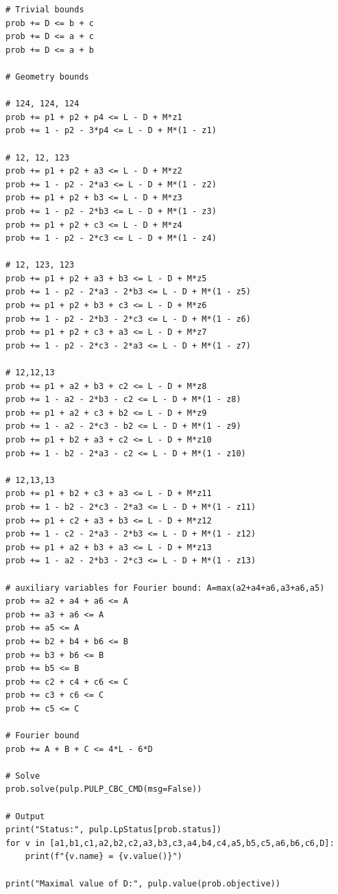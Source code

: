 \documentclass[a4paper,11pt,twoside,reqno]{amsart}
\theoremstyle{plain}
\theoremstyle{remark}
\numberwithin{prop}{section}
\numberwithin{equation}{section}
\begin{document}
\begin{lstlisting}[style=mypython]
# Trivial bounds
prob += D <= b + c
prob += D <= a + c
prob += D <= a + b

# Geometry bounds

# 124, 124, 124
prob += p1 + p2 + p4 <= L - D + M*z1
prob += 1 - p2 - 3*p4 <= L - D + M*(1 - z1)

# 12, 12, 123
prob += p1 + p2 + a3 <= L - D + M*z2
prob += 1 - p2 - 2*a3 <= L - D + M*(1 - z2)
prob += p1 + p2 + b3 <= L - D + M*z3
prob += 1 - p2 - 2*b3 <= L - D + M*(1 - z3)
prob += p1 + p2 + c3 <= L - D + M*z4
prob += 1 - p2 - 2*c3 <= L - D + M*(1 - z4)

# 12, 123, 123
prob += p1 + p2 + a3 + b3 <= L - D + M*z5
prob += 1 - p2 - 2*a3 - 2*b3 <= L - D + M*(1 - z5)
prob += p1 + p2 + b3 + c3 <= L - D + M*z6
prob += 1 - p2 - 2*b3 - 2*c3 <= L - D + M*(1 - z6)
prob += p1 + p2 + c3 + a3 <= L - D + M*z7
prob += 1 - p2 - 2*c3 - 2*a3 <= L - D + M*(1 - z7)

# 12,12,13
prob += p1 + a2 + b3 + c2 <= L - D + M*z8
prob += 1 - a2 - 2*b3 - c2 <= L - D + M*(1 - z8)
prob += p1 + a2 + c3 + b2 <= L - D + M*z9
prob += 1 - a2 - 2*c3 - b2 <= L - D + M*(1 - z9)
prob += p1 + b2 + a3 + c2 <= L - D + M*z10
prob += 1 - b2 - 2*a3 - c2 <= L - D + M*(1 - z10)

# 12,13,13
prob += p1 + b2 + c3 + a3 <= L - D + M*z11
prob += 1 - b2 - 2*c3 - 2*a3 <= L - D + M*(1 - z11)
prob += p1 + c2 + a3 + b3 <= L - D + M*z12
prob += 1 - c2 - 2*a3 - 2*b3 <= L - D + M*(1 - z12)
prob += p1 + a2 + b3 + a3 <= L - D + M*z13
prob += 1 - a2 - 2*b3 - 2*c3 <= L - D + M*(1 - z13)

# auxiliary variables for Fourier bound: A=max(a2+a4+a6,a3+a6,a5)
prob += a2 + a4 + a6 <= A
prob += a3 + a6 <= A
prob += a5 <= A
prob += b2 + b4 + b6 <= B
prob += b3 + b6 <= B
prob += b5 <= B
prob += c2 + c4 + c6 <= C
prob += c3 + c6 <= C
prob += c5 <= C

# Fourier bound
prob += A + B + C <= 4*L - 6*D

# Solve
prob.solve(pulp.PULP_CBC_CMD(msg=False))

# Output
print("Status:", pulp.LpStatus[prob.status])
for v in [a1,b1,c1,a2,b2,c2,a3,b3,c3,a4,b4,c4,a5,b5,c5,a6,b6,c6,D]:
    print(f"{v.name} = {v.value()}")

print("Maximal value of D:", pulp.value(prob.objective))
\end{lstlisting}
\end{document}
